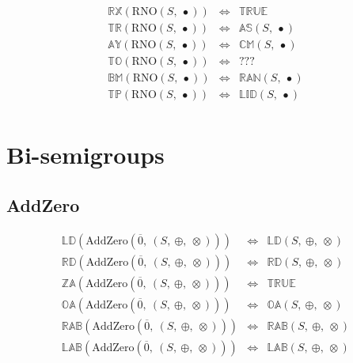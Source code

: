 \documentclass[10pt]{report}
\newcommand{\propname}[1]{{\mathbb{#1}}}
\begin{document}
\[
\begin{array}{rcl} 
\propname{RX}(\mathrm{RNO}(S,\ \bullet)) 
    & \Leftrightarrow
    & \propname{TRUE}  \\
\propname{TR}(\mathrm{RNO}(S,\ \bullet))
    & \Leftrightarrow
    & \propname{AS}(S,\ \bullet) \\
\propname{AY}(\mathrm{RNO}(S,\ \bullet))
    & \Leftrightarrow
    & \propname{CM}(S,\ \bullet) \\ 
\propname{TO}(\mathrm{RNO}(S,\ \bullet))
    & \Leftrightarrow
    & ??? \\
\propname{BM}(\mathrm{RNO}(S,\ \bullet))
    & \Leftrightarrow
    & \propname{RAN}(S,\ \bullet) \\ 
\propname{TP}(\mathrm{RNO}(S,\ \bullet))
    & \Leftrightarrow
    & \propname{LID}(S,\ \bullet) \\ 
\end{array} 
\] 


\section{Bi-semigroups}

\subsection{AddZero} 

\[
\begin{array}{rcl} 
\propname{LD}(\mathrm{AddZero}(\overline{0},\ (S,\ \oplus,\ \otimes))) 
    & \Leftrightarrow %
    & \propname{LD}(S,\ \oplus,\ \otimes) \\
\propname{RD}(\mathrm{AddZero}(\overline{0},\ (S,\ \oplus,\ \otimes))) 
    & \Leftrightarrow %
    & \propname{RD}(S,\ \oplus,\ \otimes) \\
\propname{ZA}(\mathrm{AddZero}(\overline{0},\ (S,\ \oplus,\ \otimes))) 
    & \Leftrightarrow %
    & \propname{TRUE}\\ 
\propname{OA}(\mathrm{AddZero}(\overline{0},\ (S,\ \oplus,\ \otimes))) 
    & \Leftrightarrow %
    & \propname{OA}(S,\ \oplus,\ \otimes) \\
\propname{RAB}(\mathrm{AddZero}(\overline{0},\ (S,\ \oplus,\ \otimes))) 
    & \Leftrightarrow %
    & \propname{RAB}(S,\ \oplus,\ \otimes)\\ 
\propname{LAB}(\mathrm{AddZero}(\overline{0},\ (S,\ \oplus,\ \otimes))) 
    & \Leftrightarrow %
    & \propname{LAB}(S,\ \oplus,\ \otimes)\\ 
\end{array} 
\] 
\end{document}
